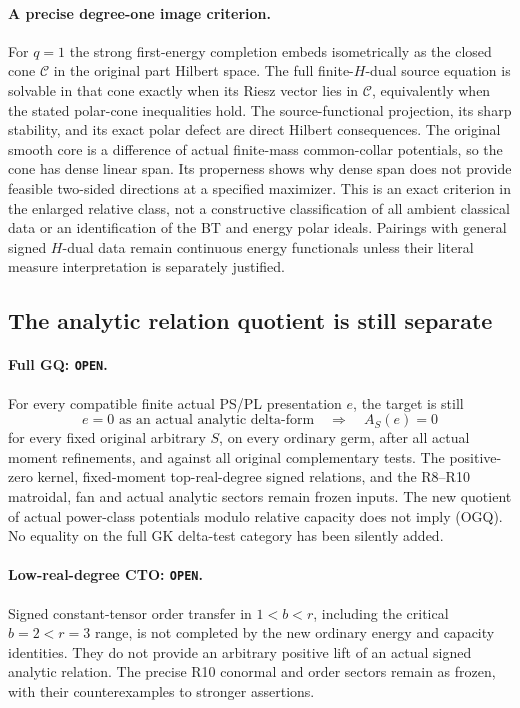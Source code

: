\paragraph{A precise degree-one image criterion.}
For $q=1$ the strong first-energy completion embeds
isometrically as the closed cone $\mathcal C$ in the
original part Hilbert space. The full finite-$H$-dual
source equation is solvable in that cone exactly when
its Riesz vector lies in $\mathcal C$, equivalently
when the stated polar-cone inequalities hold.
The source-functional projection, its sharp stability,
and its exact polar defect are direct Hilbert consequences.
The original smooth core is a difference of actual
finite-mass common-collar potentials, so the cone has
dense linear span. Its properness shows why dense span
does not provide feasible two-sided directions at a
specified maximizer.
This is an exact criterion in the enlarged relative
class, not a constructive classification of all ambient
classical data or an identification of the BT and energy
polar ideals. Pairings with general signed $H$-dual data
remain continuous energy functionals unless their literal
measure interpretation is separately justified.

\subsection{The analytic relation quotient is still separate}

\paragraph{Full GQ: \texttt{OPEN}.}
For every compatible finite actual PS/PL
presentation $e$, the target is still
\[
 e=0\text{ as an actual analytic delta-form}
           \quad\Longrightarrow\quad A_S(e)=0
 \tag{OGQ}
\]
for every fixed original arbitrary $S$,
on every ordinary germ, after all actual
moment refinements, and against all original
complementary tests.
The positive-zero kernel, fixed-moment
top-real-degree signed relations, and the
R8--R10 matroidal, fan and actual analytic
sectors remain frozen inputs.
The new quotient of actual power-class
potentials modulo relative capacity
does not imply (OGQ).
No equality on the full GK delta-test
category has been silently added.

\paragraph{Low-real-degree CTO: \texttt{OPEN}.}
Signed constant-tensor order transfer in
$1<b<r$, including the critical
$b=2<r=3$ range, is not completed by
the new ordinary energy and capacity
identities.  They do not provide an
arbitrary positive lift of an actual
signed analytic relation.
The precise R10 conormal and order
sectors remain as frozen, with their
counterexamples to stronger assertions.


